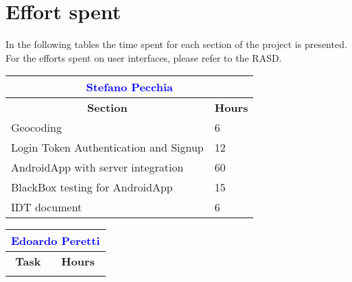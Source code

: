 \section{Effort spent}
In the following tables the time spent for each section of the project is presented. For the efforts spent on user interfaces, please refer to the RASD.

\renewcommand\arraystretch{1.5}
\begin{table}[ht]
\centering
\begin{tabular}{|l|l|}
\multicolumn{2}{c}{\textcolor{Blue}{\textbf{Stefano Pecchia}}} \\\hline
\multicolumn{1}{|c|}{\textbf{Section}} & \multicolumn{1}{|c|}{\textbf{Hours}} \\\hline
    Geocoding & 6
    \\ \hline
    Login Token Authentication and Signup & 12
    \\ \hline
    AndroidApp with server integration & 60
      \\ \hline 
    BlackBox testing for AndroidApp & 15
	\\ \hline
	IDT document & 6
		\\ \hline

	\end{tabular} \hspace{2.5em}
	\begin{tabular}{|l|l|}
\multicolumn{2}{c}{\textcolor{Blue}{\textbf{Edoardo Peretti}}} \\\hline
\multicolumn{1}{|c|}{\textbf{Task}} & \multicolumn{1}{|c|}{\textbf{Hours}} \\\hline

	\\ \hline
\end{tabular}
\end{table}